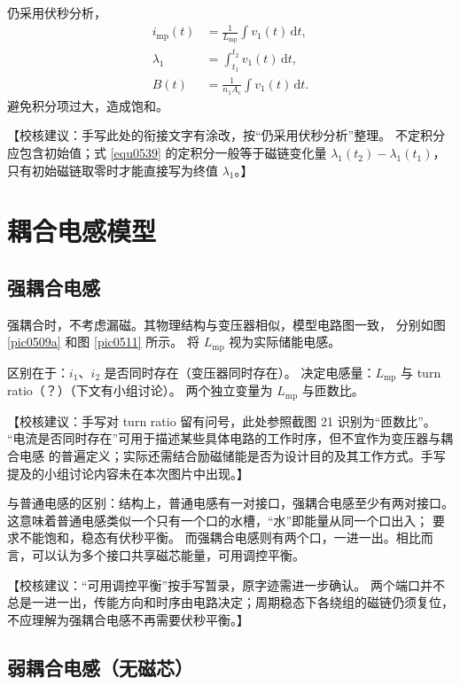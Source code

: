 \documentclass[
  12pt,
  UTF8,
  a4paper,
  fontset=fandol,
  oneside,
  openany
]{ctexrep}
\newcommand{\reviewnote}[1]{%
  \par\smallskip
  {\color{reviewgray}\small\noindent【校核建议：#1】\par}
  \smallskip
}
\begin{document}
仍采用伏秒分析，
\begin{align}
  i_{\mathrm{mp}}(t) & =\frac{1}{L_{\mathrm{mp}}}\int v_1(t)\,\mathrm{d}t,
  \label{equ0538}                                                                           \\
  \lambda_1          & =\int_{t_1}^{t_2}v_1(t)\,\mathrm{d}t,\label{equ0539}                 \\
  B(t)               & =\frac{1}{n_1A_{\mathrm{c}}}\int v_1(t)\,\mathrm{d}t.\label{equ0540}
\end{align}
避免积分项过大，造成饱和。
\reviewnote{手写此处的衔接文字有涂改，按“仍采用伏秒分析”整理。
  不定积分应包含初始值；式 \eqref{equ0539} 的定积分一般等于磁链变化量
  $\lambda_1(t_2)-\lambda_1(t_1)$，只有初始磁链取零时才能直接写为终值 $\lambda_1$。}

\section{耦合电感模型}

\subsection{强耦合电感}

强耦合时，不考虑漏磁。其物理结构与变压器相似，模型电路图一致，
分别如图 \ref{pic0509a} 和图 \ref{pic0511} 所示。
将 $L_{\mathrm{mp}}$ 视为实际储能电感。

区别在于：$i_1$、$i_2$ 是否同时存在（变压器同时存在）。
决定电感量：$L_{\mathrm{mp}}$ 与 turn ratio（？）（下文有小组讨论）。
两个独立变量为 $L_{\mathrm{mp}}$ 与匝数比。
\reviewnote{手写对 turn ratio 留有问号，此处参照截图 21 识别为“匝数比”。
  “电流是否同时存在”可用于描述某些具体电路的工作时序，但不宜作为变压器与耦合电感
  的普遍定义；实际还需结合励磁储能是否为设计目的及其工作方式。手写提及的小组讨论内容未在本次图片中出现。}

与普通电感的区别：结构上，普通电感有一对接口，强耦合电感至少有两对接口。
这意味着普通电感类似一个只有一个口的水槽，“水”即能量从同一个口出入；
要求不能饱和，稳态有伏秒平衡。
而强耦合电感则有两个口，一进一出。相比而言，可以认为多个接口共享磁芯能量，可用调控平衡。
\reviewnote{“可用调控平衡”按手写暂录，原字迹需进一步确认。
  两个端口并不总是一进一出，传能方向和时序由电路决定；周期稳态下各绕组的磁链仍须复位，
  不应理解为强耦合电感不再需要伏秒平衡。}

\subsection{弱耦合电感（无磁芯）}
\end{document}
